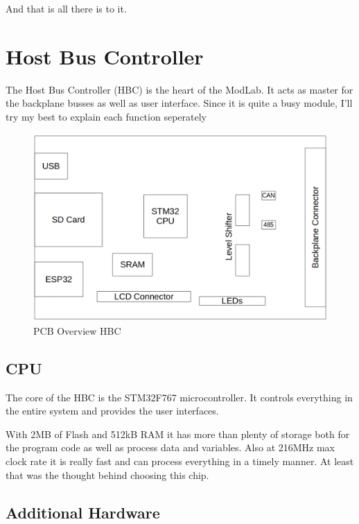 And that is all there is to it. 


\section{Host Bus Controller}
The Host Bus Controller (HBC) is the heart of the ModLab. It acts as master for the backplane busses as well as user interface. Since it is quite a busy module, I'll try my best to explain each function seperately

\begin{figure}[H]
	\centering
		\includegraphics[width=\textwidth]{pictures/overview_cpu.png}
	\caption{PCB Overview HBC}
	\label{img:HBC}
\end{figure}

\subsection{CPU}

The core of the HBC is the STM32F767 microcontroller. It controls everything in the entire system and provides the user interfaces. 

With 2MB of Flash and 512kB RAM it has more than plenty of storage both for the program code as well as process data and variables. Also at 216MHz max clock rate it is really fast and can process everything in a timely manner. At least that was the thought behind choosing this chip. 

\subsection{Additional Hardware}

